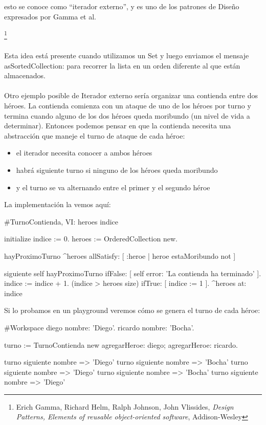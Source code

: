\documentclass[a4paper,12pt]{book}
\begin{document}
esto se conoce como ``iterador externo'', y es uno de los patrones de Diseño expresados por Gamma et al.{\footnote{
Erich Gamma, Richard Helm, Ralph Johnson, John Vlissides, \textit{Design Patterns, Elements of reusable 
object-oriented software}, Addison-Wesley}
\\
\\
Esta idea está presente cuando utilizamos un Set y luego enviamos el mensaje asSortedCollection: para recorrer
la lista en un orden diferente al que están almacenados. 
\\
\\
Otro ejemplo posible de Iterador externo sería organizar una contienda entre dos héroes. La contienda comienza
con un ataque de uno de los héroes por turno y termina cuando alguno de los dos héroes queda moribundo
(un nivel de vida a determinar). Entonces podemos pensar en que la contienda necesita una abstracción que
maneje el turno de ataque de cada héroe:

\begin{itemize}
 \item el iterador necesita conocer a ambos héroes
 \item habrá siguiente turno si ninguno de los héroes queda moribundo
 \item y el turno se va alternando entre el primer y el segundo héroe
\end{itemize}

La implementación la vemos aquí:

\begin{code}
#TurnoContienda, VI: heroes indice

initialize
   indice := 0.
   heroes := OrderedCollection new.
   
hayProximoTurno
   ^heroes allSatisfy: [ :heroe | heroe estaMoribundo not ]
   
siguiente
   self hayProximoTurno ifFalse: [ self error: 'La contienda ha terminado' ].
   indice := indice + 1.
   (indice > heroes size) ifTrue: [ indice := 1 ].
   ^heroes at: indice
\end{code}

Si lo probamos en un playground veremos cómo se genera el turno de cada héroe:

\begin{code}
#Workspace
diego nombre: 'Diego'.
ricardo nombre: 'Bocha'.

turno := TurnoContienda new 
   agregarHeroe: diego;
   agregarHeroe: ricardo.

turno siguiente nombre => 'Diego'
turno siguiente nombre => 'Bocha'
turno siguiente nombre => 'Diego'
turno siguiente nombre => 'Bocha'
turno siguiente nombre => 'Diego'
\end{code}

}
\end{document}
